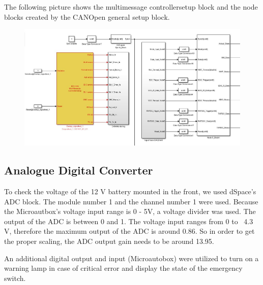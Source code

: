 The following picture shows the multimessage controllersetup block and the node blocks created by the CANOpen general setup block.
\begin{figure}[h]
	\centering
	\includegraphics[width=0.7\linewidth]{pictures_figures/Used/Picture_Matlab}
	\caption{}
	\label{fig:picturematlab}
\end{figure}



\subsection{Analogue Digital Converter}

To check the voltage of the 12 V battery mounted in the front, we used dSpace's ADC block. The module number 1 and the channel number 1 were used. Because the Microautbox's voltage input range is 0 - 5V, a voltage divider was used. The output of the ADC is between 0 and 1. The voltage input ranges from 0 to ~4.3 V, therefore the maximum output of the ADC is around 0.86. So in order to get the proper scaling, the ADC output gain needs to be around 13.95. 

An additional digital output and input (Microautobox) were utilized to turn on a warning lamp in case of critical error and display the state of the emergency switch. 